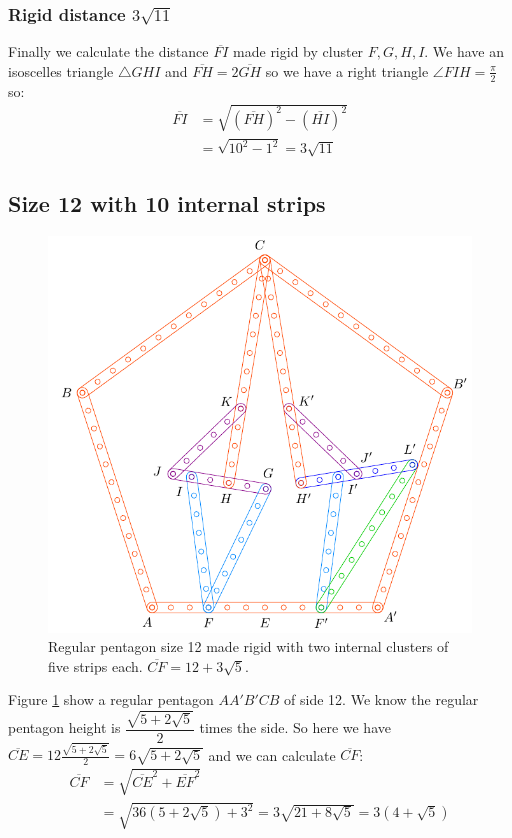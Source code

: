 \documentclass[11pt]{article}
\begin{document}
\subsubsection{Rigid distance $3\sqrt{11}$}

Finally we calculate the distance $\overline{FI}$ made rigid by cluster $F,G,H,I$. We have an isoscelles triangle $\triangle{GHI}$ and $\overline{FH}=2\overline{GH}$ so we have a right triangle $\angle{FIH}=\frac{\pi}2$ so: \begin{align}
\overline{FI} &= \sqrt{(\overline{FH})^2 - (\overline{HI})^2}\nonumber\\
 &= \sqrt{10^2 - 1^2} = 3\sqrt{11}
\end{align}


\subsection{Size 12 with 10 internal strips}

\begin{figure}[H]
 \centering
 \includegraphics[scale=0.80]{12/penta12-10a}
 \caption{Regular pentagon size 12 made rigid with two internal clusters of five strips each.  $\overline{CF} = 12 + 3\sqrt5$.}
 \label{fig:penta12-10a}
\end{figure}

Figure \ref{fig:penta12-10a} show a regular pentagon $AA'B'CB$ of side 12. We know the regular pentagon height is $\dfrac{\sqrt{5+2\sqrt5}}2$ times the side. So here we have $\overline{CE} = 12\frac{\sqrt{5+2\sqrt5}}2 = 6\sqrt{5+2\sqrt5}$ and we can calculate $\overline{CF}$:
\begin{align}
\overline{CF} &= \sqrt{\overline{CE}^2 + \overline{EF}^2}\nonumber\\
 &= \sqrt{36(5+2\sqrt5) + 3^2} = 3\sqrt{21+8\sqrt5} = 3(4 + \sqrt5)
\end{align}
\end{document}
